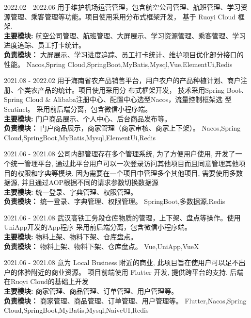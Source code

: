 \documentclass[zh]{resume}
\begin{document}
\begin{projects}
	\project
  {\color{accentcolor}{机场运营管理}}{2022.02 - 2022.06}
  {
    用于维护机场运营管理，包含航空公司管理、航班管理、学习资源管理、乘客管理等功能。项目使用采用分布式框架开发，
    基于 Ruoyi Cloud 框架. \\
  {\textbf{主要模块: } 航空公司管理、航班管理、大屏展示、学习资源管理、乘客管理、学习进度追踪、员工打卡统计。} \\
  {\textbf{负责模块：} 大屏展示、学习进度追踪、员工打卡统计、维护项目优化部分接口的性能。}
  }
  {Nacos,Spring Cloud,SpringBoot,MyBatis,Mysql,Vue,ElementUi,Redis}

	\project
  {\color{accentcolor}{田园网}}{2021.08 - 2022.02}
  {
    用于海南省农产品销售平台，用户农户的产品种植计划、商户注册、个类农产品的统计。项目使用采用分 布式框架开发，
    技术采用Spring Boot、Spring Cloud \& Alibaba注册中心、配置中心选型Nacos，流量控制框架选 型Sentinel。
    采用前后端分离，包含微信小程序端。\\ 
  {\textbf{主要模块: } 门户商品展示、个人中心、后台商品发布等。} \\
  {\textbf{负责模块：} 门户商品展示，商家管理（商家审核、商家上下架）。}
  }
  {Nacos,Spring Cloud,SpringBoot,MyBatis,Mysql,ElementUi,Redis}

	\project
  {\color{accentcolor}{统一管理平台}}{2021.06 - 2021.08}
  {
    公司内部管理存在多个管理系统, 为了方便用户使用, 开发了一个统一管理平台, 
    通过此平台用户可以一次登录访问其他项目而且同意管理其他项目的权限和字典等模块. 
    因为需要在一个项目中管理多个其他项目, 需要使用多数据源, 并且通过AOP根据不同的请求参数切换数据源\\
    {\textbf{主要模块: } 统一登录、字典管理、权限管理。} \\
    {\textbf{负责模块：} 统一登录、字典管理、权限管理。}
  }
  {SpringBoot,多数据源,Redis}

	\project
  {\color{accentcolor}{武汉高铁工务段仓库APP}}{2021.06 - 2021.08}
  {
    武汉高铁工务段仓库物质的管理，上下架、盘点等操作。使用UniApp开发的App程序
    采用前后端分离，包含微信小程序端。\\ 
    {\textbf{主要模块: } 物料上架、物料下架、仓库盘点。} \\
    {\textbf{负责模块：} 物料上架、物料下架、仓库盘点。}
  }
  {Vue,UniApp,VueX}


	\project
  {\color{accentcolor}{LocalBiz}}{2021.06 - 2021.08}
  {
    意为 Local Business 附近的商业,  此项目旨在使用户可以足不出户的体验附近的商业资源。
    项目前端使用 Flutter 开发, 提供跨平台的支持. 后端在Ruoyi Cloud的基础上开发 \\
    {\textbf{主要模块: } 商家管理、商品管理、订单管理、用户管理等。} \\
    {\textbf{负责模块：} 商家管理、商品管理、订单管理、用户管理等。}
  }
  {Flutter,Nacos,Spring Cloud,SpringBoot,MyBatis,Mysql,NaiveUI,Redis}




\end{projects}
\end{document}
